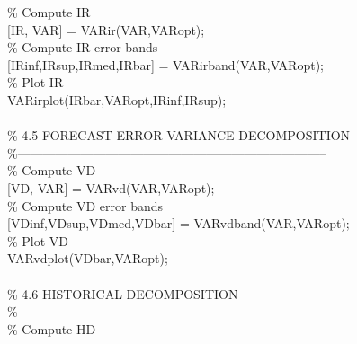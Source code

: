 \hspace{1mm}\textcolor{matlabgreen}{\% Compute IR }\\ 
\hspace{1mm}[IR, VAR] = VARir(VAR,VARopt); \\ 
\hspace{1mm}\textcolor{matlabgreen}{\% Compute IR error bands }\\ 
\hspace{1mm}[IRinf,IRsup,IRmed,IRbar] = VARirband(VAR,VARopt); \\ 
\hspace{1mm}\textcolor{matlabgreen}{\% Plot IR }\\ 
\hspace{1mm}VARirplot(IRbar,VARopt,IRinf,IRsup); \\ 
\hspace{1mm} \\ 
\hspace{1mm}\textcolor{matlabgreen}{\% 4.5 FORECAST ERROR VARIANCE DECOMPOSITION }\\ 
\hspace{1mm}\textcolor{matlabgreen}{\%--------------------------------------------------------------------------  }\\ 
\hspace{1mm}\textcolor{matlabgreen}{\% Compute VD }\\ 
\hspace{1mm}[VD, VAR] = VARvd(VAR,VARopt); \\ 
\hspace{1mm}\textcolor{matlabgreen}{\% Compute VD error bands }\\ 
\hspace{1mm}[VDinf,VDsup,VDmed,VDbar] = VARvdband(VAR,VARopt); \\ 
\hspace{1mm}\textcolor{matlabgreen}{\% Plot VD }\\ 
\hspace{1mm}VARvdplot(VDbar,VARopt); \\ 
\hspace{1mm} \\ 
\hspace{1mm}\textcolor{matlabgreen}{\% 4.6 HISTORICAL DECOMPOSITION }\\ 
\hspace{1mm}\textcolor{matlabgreen}{\%--------------------------------------------------------------------------  }\\ 
\hspace{1mm}\textcolor{matlabgreen}{\% Compute HD }\\ 

